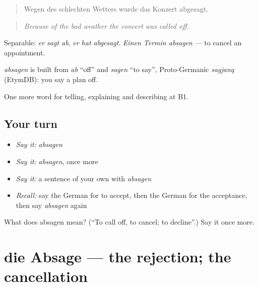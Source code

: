 \begin{quote}
Wegen des schlechten Wetters wurde das Konzert abgesagt.
\end{quote}

\begin{quote}
\emph{Because of the bad weather the concert was called off.}
\end{quote}

Separable: \emph{er sagt ab}, \emph{er hat abgesagt}. \emph{Einen Termin absagen} — to cancel an appointment.

\begin{cousinweb}
\emph{absagen} is built from \emph{ab} \textquotedblleft{}off\textquotedblright{} and \emph{sagen} \textquotedblleft{}to say\textquotedblright{}, Proto-Germanic \emph{sagjaną} (EtymDB): you say a plan off.
\end{cousinweb}

\begin{grammarlens}[title={What you've built}]
One more word for telling, explaining and describing at B1.
\end{grammarlens}

\subsection*{Your turn}
\begin{itemize}
\raggedright
  \item \emph{Say it:} \emph{absagen}
  \item \emph{Say it:} \emph{absagen}, once more
  \item \emph{Say it:} a sentence of your own with \emph{absagen}
  \item \emph{Recall:} say the German for to accept, then the German for the acceptance, then say \emph{absagen} again
\end{itemize}

\begin{tcolorbox}[breakable,colback=teal!4,colframe=teal!35!black,title={Before you move on}]
What does absagen mean? (\textquotedblleft{}To call off, to cancel; to decline\textquotedblright{}.) Say it once more.
\end{tcolorbox}
\section[die Absage]{die Absage — the rejection; the cancellation}

\label{lesson:GE-C371-absage}



